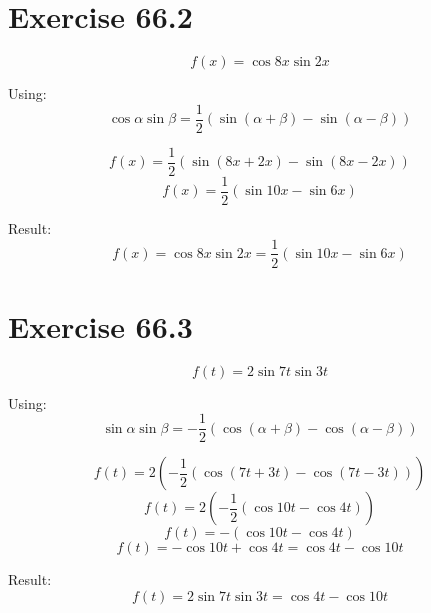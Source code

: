 \documentclass[a4paper, 10pt]{scrartcl}
\begin{document}
\section{Exercise 66.2}

\[f(x) = \cos{8x}\sin{2x}\]

Using:
\[\cos{\alpha}\sin{\beta} = \frac{1}{2}(\sin{(\alpha + \beta)} - \sin{(\alpha - \beta)})\]

\[f(x) = \frac{1}{2}(\sin{(8x + 2x)} - \sin{(8x - 2x)})\]
\[f(x) = \frac{1}{2}(\sin{10x} - \sin{6x})\]

Result:
\[f(x) = \cos{8x}\sin{2x} = \frac{1}{2}(\sin{10x} - \sin{6x})\]

\section{Exercise 66.3}

\[f(t) = 2\sin{7t}\sin{3t}\]

Using:
\[\sin{\alpha}\sin{\beta} = -\frac{1}{2}(\cos{(\alpha + \beta)} - \cos{(\alpha - \beta)})\]

\[f(t) = 2\left(-\frac{1}{2}(\cos{(7t + 3t)} - \cos{(7t - 3t)})\right)\]
\[f(t) = 2\left(-\frac{1}{2}(\cos{10t} - \cos{4t})\right)\]
\[f(t) = -(\cos{10t} - \cos{4t})\]
\[f(t) = -\cos{10t} + \cos{4t} = \cos{4t} - \cos{10t}\]

Result:
\[f(t) = 2\sin{7t}\sin{3t} = \cos{4t} - \cos{10t}\]
\end{document}

